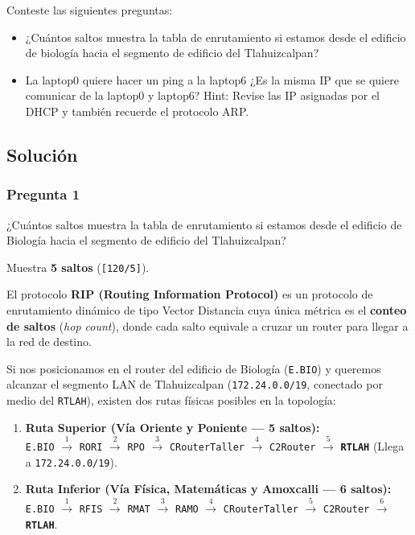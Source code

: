 \begin{tcolorbox}[enunciado]
Conteste las siguientes preguntas:
\begin{itemize}
    \item ¿Cuántos saltos muestra la tabla de enrutamiento si estamos desde el edificio de biología hacia el segmento de edificio del Tlahuizcalpan?
    \item La laptop0 quiere hacer un ping a la laptop6 ¿Es la misma IP que se quiere comunicar de la laptop0 y laptop6? Hint: Revise las IP asignadas por el DHCP y también recuerde el protocolo ARP.
\end{itemize}
\end{tcolorbox}

\subsection*{Solución}
\subsubsection*{Pregunta 1}
\begin{tcolorbox}[enunciado]
¿Cuántos saltos muestra la tabla de enrutamiento si estamos desde el edificio de Biología hacia el segmento de edificio del Tlahuizcalpan?
\end{tcolorbox}

Muestra \textbf{5 saltos} (\texttt{[120/5]}).

El protocolo \textbf{RIP (Routing Information Protocol)} es un protocolo de enrutamiento dinámico de tipo Vector Distancia cuya única métrica es el \textbf{conteo de saltos} (\textit{hop count}), donde cada salto equivale a cruzar un router para llegar a la red de destino.

Si nos posicionamos en el router del edificio de Biología (\texttt{E.BIO}) y queremos alcanzar el segmento LAN de Tlahuizcalpan (\texttt{172.24.0.0/19}, conectado por medio del \texttt{RTLAH}), existen dos rutas físicas posibles en la topología:

\begin{enumerate}[leftmargin=*]
    \item \textbf{Ruta Superior (Vía Oriente y Poniente --- 5 saltos):} \\
    \texttt{E.BIO} $\xrightarrow{\text{1}}$ \texttt{RORI} $\xrightarrow{\text{2}}$ \texttt{RPO} $\xrightarrow{\text{3}}$ \texttt{CRouterTaller} $\xrightarrow{\text{4}}$ \texttt{C2Router} $\xrightarrow{\text{5}}$ \textbf{\texttt{RTLAH}} (Llega a \texttt{172.24.0.0/19}).

    \item \textbf{Ruta Inferior (Vía Física, Matemáticas y Amoxcalli --- 6 saltos):} \\
    \texttt{E.BIO} $\xrightarrow{1}$ \texttt{RFIS} $\xrightarrow{2}$ \texttt{RMAT} $\xrightarrow{3}$ \texttt{RAMO} $\xrightarrow{4}$ \texttt{CRouterTaller} $\xrightarrow{5}$ \texttt{C2Router} $\xrightarrow{6}$ \textbf{\texttt{RTLAH}}.
\end{enumerate}


